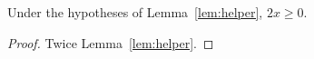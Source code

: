 
\begin{corollary}\label{cor:sib}
Under the hypotheses of Lemma~\ref{lem:helper}, $2x \ge 0$.
\end{corollary}

\begin{proof}
Twice Lemma~\ref{lem:helper}.
\end{proof}
